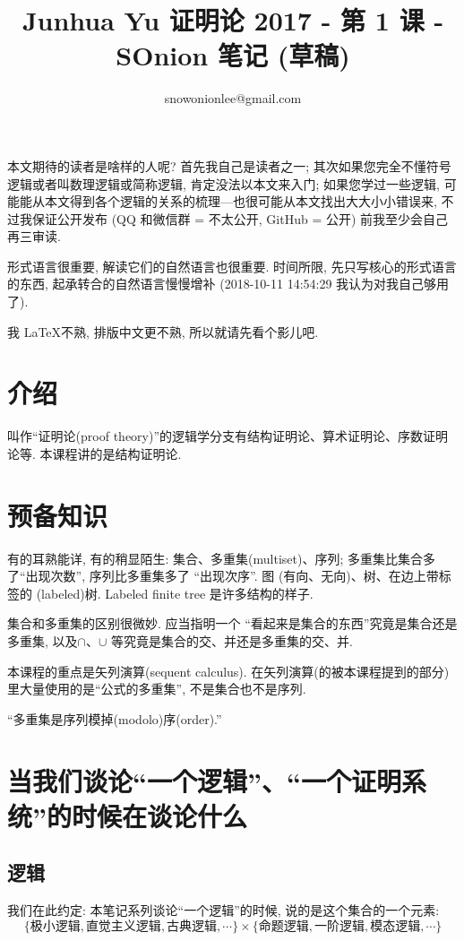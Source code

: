 \documentclass{article}
\title{Junhua Yu 证明论 2017 - 第 1 课 - SOnion 笔记 (草稿)}
\author{snowonionlee@gmail.com}
\date{\DTMnow}
\begin{document}
\maketitle

本文期待的读者是啥样的人呢? 首先我自己是读者之一; 其次如果您完全不懂符号逻辑或者叫数理逻辑或简称逻辑, 肯定没法以本文来入门; 如果您学过一些逻辑, 可能能从本文得到各个逻辑的关系的梳理---也很可能从本文找出大大小小错误来, 不过我保证公开发布 (QQ 和微信群 = 不太公开, GitHub = 公开) 前我至少会自己再三审读.

形式语言很重要, 解读它们的自然语言也很重要. 时间所限, 先只写核心的形式语言的东西, 起承转合的自然语言慢慢增补 (2018-10-11 14:54:29 我认为对我自己够用了).

我 \LaTeX 不熟, 排版中文更不熟, 所以就请先看个影儿吧.

\section{介绍}

叫作``证明论(proof theory)''的逻辑学分支有结构证明论、算术证明论、序数证明论等. 本课程讲的是结构证明论.

\section{预备知识}

有的耳熟能详, 有的稍显陌生: 集合、多重集(multiset)、序列; 多重集比集合多了``出现次数'', 序列比多重集多了 ``出现次序''. 图 (有向、无向)、树、在边上带标签的 (labeled)树. Labeled finite tree 是许多结构的样子.

集合和多重集的区别很微妙. 应当指明一个 ``看起来是集合的东西''究竟是集合还是多重集, 以及$\cap$、$\cup$ 等究竟是集合的交、并还是多重集的交、并. 

本课程的重点是矢列演算(sequent calculus). 在矢列演算(的被本课程提到的部分)里大量使用的是``公式的多重集'', 不是集合也不是序列.

``多重集是序列模掉(modolo)序(order).''

\section{当我们谈论``一个逻辑''、``一个证明系统''的时候在谈论什么}

\subsection{逻辑}

我们在此约定: 本笔记系列谈论``一个逻辑''的时候, 说的是这个集合的一个元素:
$$
\{\text{极小逻辑}, \text{直觉主义逻辑}, \text{古典逻辑}, \cdots\} \times \{\text{命题逻辑}, \text{一阶逻辑}, \text{模态逻辑}, \cdots\}
$$
\end{document}
